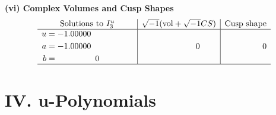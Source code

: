 \documentclass[1p]{elsarticle_modified}
\theoremstyle{definition}
\newcommand{\I}{\sqrt{-1}}
\begin{document}
\newpage\flushleft \textbf{(vi) Complex Volumes and Cusp Shapes}
$$\begin{array}{c|c|c}  
\text{Solutions to }I^u_{3}& \I (\text{vol} + \sqrt{-1}CS) & \text{Cusp shape}\\
 \hline 
\begin{aligned}
u &= -1.00000\phantom{ +0.000000I} \\
a &= -1.00000\phantom{ +0.000000I} \\
b &= \phantom{-0.000000 } 0\end{aligned}
 & \phantom{-0.000000 } 0 & \phantom{-0.000000 } 0\\
 \hline 
 \end{array}$$\newpage
\newpage\renewcommand{\arraystretch}{1}
\centering \section*{ IV. u-Polynomials}
\end{document}
